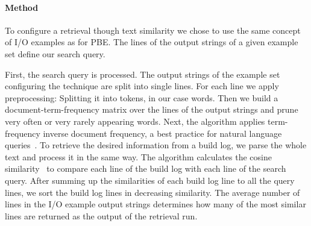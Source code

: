 \documentclass[\myrootdir/main.tex]{subfiles}
\begin{document}
\paragraph{Method}
To configure a retrieval though text similarity we chose to use the same concept of I/O examples as for PBE\@.
The lines of the output strings of a given example set define our search query.

First, the search query is processed.
The output strings of the example set configuring the technique are split into single lines.
For each line we apply preprocessing: Splitting it into tokens, in our case words.
Then we build a document-term-frequency matrix over the lines of the output strings and prune very often or very rarely appearing words.
Next, the algorithm applies term-frequency inverse document frequency, a best practice for natural language queries~\cite{lee1997document}.
To retrieve the desired information from a build log, we parse the whole text and process it in the same way.
The algorithm calculates the cosine similarity~\cite{korenius2007principal} to compare each line of the build log with each line of the search query.
After summing up the similarities of each build log line to all the query lines, we sort the build log lines in decreasing similarity.
The average number of lines in the I/O example output strings determines how many of the most similar lines are returned as the output of the retrieval run.

\end{document}
